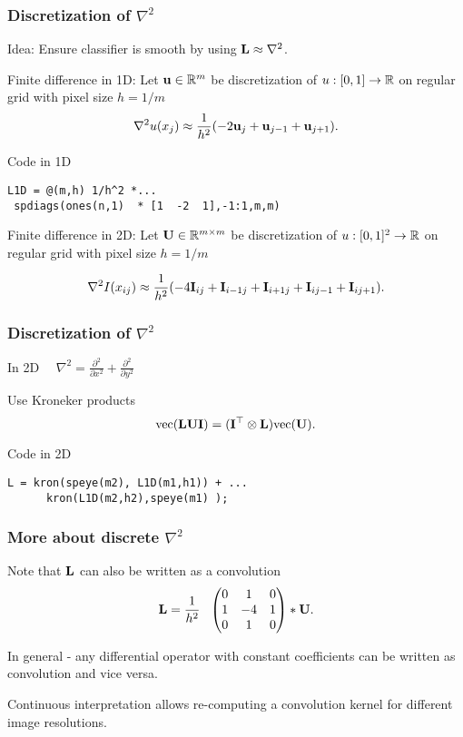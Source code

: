 \documentclass[12pt,fleqn,handout]{beamer}
\begin{document}
\begin{frame}[fragile]\frametitle{Discretization of $\nabla^2$}
	
	Idea: Ensure classifier is smooth by using ${\bf L} \approx \nabla^2$.
	
	\bigskip
	\pause

Finite difference in 1D: 	Let ${\bf u} \in \mathbb{R}^{m}$ be discretization of $u: [0,1] \to \mathbb{R}$ on regular grid with pixel size $h=1/m$
$$ \nabla^2 u(x_j) \approx  {\frac 1 {h^2}} (-2 {\bf u}_{j} +  {\bf u}_{j-1} + {\bf u}_{j+1}). $$

\bigskip
\pause
Code in 1D
\begin{verbatim}
L1D = @(m,h) 1/h^2 *...
 spdiags(ones(n,1)  * [1  -2  1],-1:1,m,m)
\end{verbatim}


\bigskip
\pause

Finite difference in 2D: Let ${\bf U} \in \mathbb{R}^{m\times m}$ be discretization of $u: [0,1]^2 \to \mathbb{R}$ on regular grid with pixel size $h=1/m$

$$ \nabla^2 I(x_{ij}) \approx  {\frac 1 {h^2}} (-4 {\bf I}_{ij} + {\bf I}_{i-1j} + {\bf I}_{i+1j} + {\bf I}_{ij-1} + {\bf I}_{ij+1}). $$


\bigskip


\end{frame}


\begin{frame}[fragile]\frametitle{Discretization of $\nabla^2$}

In 2D $\quad \nabla^2 = {\frac {\partial^2}{\partial x^2}} + {\frac {\partial^2}{\partial y^2}} $


\bigskip

Use Kroneker products
$$ {\rm vec}({\bf L} {\bf U} {\bf I}) = ({\bf I}^{\top} \otimes {\bf L}) {\rm vec} ({\bf U}). $$


Code in 2D
\begin{verbatim}
L = kron(speye(m2), L1D(m1,h1)) + ...
      kron(L1D(m2,h2),speye(m1) );
\end{verbatim}

\end{frame}

\begin{frame}[fragile]\frametitle{More about discrete $\nabla^2$}

Note that ${\bf L}$ can also be written as a convolution
$$ \bfL = {\frac 1 {h^2}}\ \  \begin{pmatrix} 0  &  1  &  0 \\ 1  & -4  & 1 \\ 0  & 1  & 0 \end{pmatrix} * \bfU. $$

In general - any differential operator with constant coefficients can be written
as convolution and vice versa.

\bigskip

Continuous interpretation allows re-computing a convolution kernel for different image resolutions.


\end{frame}
\end{document}
